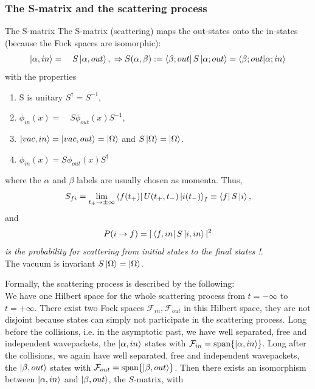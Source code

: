 \subsubsection{The S-matrix and the scattering process}
\begin{mybox}{The S-matrix}
	The S-matrix (scattering) maps the out-states onto the in-states (because the Fock spaces are isomorphic):
	\begin{equation}
		\ket{\alpha, in} = \quad S\ket{\alpha, out}, \;\Rightarrow S(\alpha,\beta):= \bra{\beta;out} S\ket{\alpha;out} = \bra{\beta;out}\ket{\alpha;in}
	\end{equation}
	with the properties
	\begin{enumerate}
		\item S is unitary $S^{\dagger} = S^{-1}$,
		\item $\phi_{in}(x) = \quad S \phi_{out}(x) S^{-1}$,
		\item $\ket{vac, in} =\ket{vac, out} = \ket{\Omega}$ and $S\ket{\Omega}=\ket{\Omega}$.
		\item $\phi_{in}(x) = S\phi_{out}(x) S^\dagger$
	\end{enumerate}
where the $\alpha$ and $\beta$ labels are usually chosen as momenta.
Thus, 
\begin{equation}
	S_{fi} = \lim_{t_{\pm} \rightarrow\pm \infty} \bra{f(t_+)} U(t_+,t_-) \ket{i(t_-)}_I \equiv \bra{f}S\ket{i},
\end{equation}
and
\begin{equation}
P(i\rightarrow f) =|\bra{f,in}S\ket{i,in}|^2 
\end{equation}
\emph{is the probability for scattering from initial states to the final states !}.\\
The vacuum is invariant $S\ket{\Omega}=\ket{\Omega}$.
\end{mybox}
Formally, the scattering process is described  by the following:\\
We have one Hilbert space for the whole scattering process from $t=-\infty$ to $t=+\infty$. There exist two Fock spaces $\mathcal{F}_{in}, \mathcal{F}_{out}$ in this Hilbert space, they are not disjoint because states can simply not participate in the scattering process. Long before the collisions, i.e. in the asymptotic past, we have well separated, free and independent wavepackets, the $\ket{\alpha,in}$ states with $\mathcal{F}_{in}=\mathrm{span}\{\ket{\alpha,in}\}$. Long after the collisions, we again have well separated, free and independent wavepackets, the $\ket{\beta,out}$ states with $\mathcal{F}_{out} = \mathrm{span}\{\ket{\beta,out}\}$. Then there exists an isomorphism between $\ket{\alpha,in}$ and $\ket{\beta,out}$, the $S$-matrix, with
